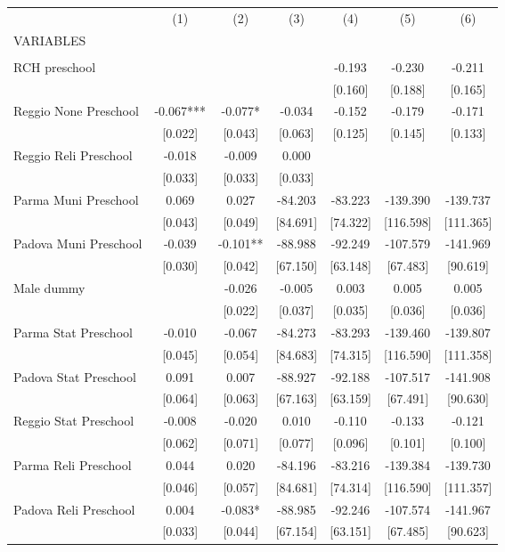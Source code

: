 \begin{tabular}{lcccccc} \hline
 & (1) & (2) & (3) & (4) & (5) & (6) \\
VARIABLES &  &  &  &  &  &  \\ \hline
 &  &  &  &  &  &  \\
RCH preschool &  &  &  & -0.193 & -0.230 & -0.211 \\
 &  &  &  & [0.160] & [0.188] & [0.165] \\
Reggio None Preschool & -0.067*** & -0.077* & -0.034 & -0.152 & -0.179 & -0.171 \\
 & [0.022] & [0.043] & [0.063] & [0.125] & [0.145] & [0.133] \\
Reggio Reli Preschool & -0.018 & -0.009 & 0.000 &  &  &  \\
 & [0.033] & [0.033] & [0.033] &  &  &  \\
Parma Muni Preschool & 0.069 & 0.027 & -84.203 & -83.223 & -139.390 & -139.737 \\
 & [0.043] & [0.049] & [84.691] & [74.322] & [116.598] & [111.365] \\
Padova Muni Preschool & -0.039 & -0.101** & -88.988 & -92.249 & -107.579 & -141.969 \\
 & [0.030] & [0.042] & [67.150] & [63.148] & [67.483] & [90.619] \\
Male dummy &  & -0.026 & -0.005 & 0.003 & 0.005 & 0.005 \\
 &  & [0.022] & [0.037] & [0.035] & [0.036] & [0.036] \\
Parma Stat Preschool & -0.010 & -0.067 & -84.273 & -83.293 & -139.460 & -139.807 \\
 & [0.045] & [0.054] & [84.683] & [74.315] & [116.590] & [111.358] \\
Padova Stat Preschool & 0.091 & 0.007 & -88.927 & -92.188 & -107.517 & -141.908 \\
 & [0.064] & [0.063] & [67.163] & [63.159] & [67.491] & [90.630] \\
Reggio Stat Preschool & -0.008 & -0.020 & 0.010 & -0.110 & -0.133 & -0.121 \\
 & [0.062] & [0.071] & [0.077] & [0.096] & [0.101] & [0.100] \\
Parma Reli Preschool & 0.044 & 0.020 & -84.196 & -83.216 & -139.384 & -139.730 \\
 & [0.046] & [0.057] & [84.681] & [74.314] & [116.590] & [111.357] \\
Padova Reli Preschool & 0.004 & -0.083* & -88.985 & -92.246 & -107.574 & -141.967 \\
 & [0.033] & [0.044] & [67.154] & [63.151] & [67.485] & [90.623] \\

\end{tabular}
